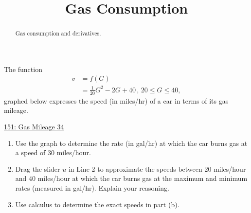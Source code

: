 \documentclass{ximera}
\title{Gas Consumption}
\begin{document}
\begin{abstract}
Gas consumption and derivatives.
\end{abstract}
\maketitle

\begin{question} \label{Qghlfgvnhhgeyghhg}
The function 
\begin{align*}
    v  &= f(G)    \\
         &= \frac{1}{20}G^2 - 2G + 40 \, , \, 20\leq G \leq 40 ,
\end{align*}
graphed below expresses the speed (in miles/hr) of a car in terms of its gas mileage.

\begin{onlineOnly}
    \begin{center}
\end{center}
\end{onlineOnly}

\href{https://www.desmos.com/calculator/r375yhaxuj}{151: Gas Mileage 34}

\begin{enumerate}
\item Use the graph to determine the rate (in gal/hr) at which the car burns gas at a speed of $30$ miles/hour.

\item Drag the slider $u$ in Line 2 to approximate the speeds between $20$ miles/hour and $40$ miles/hour at which the car burns gas at the maximum and minimum rates (measured in gal/hr). Explain your reasoning.

\item Use calculus to determine the exact speeds in part (b). 
\end{enumerate}


\end{question}
\end{document}
